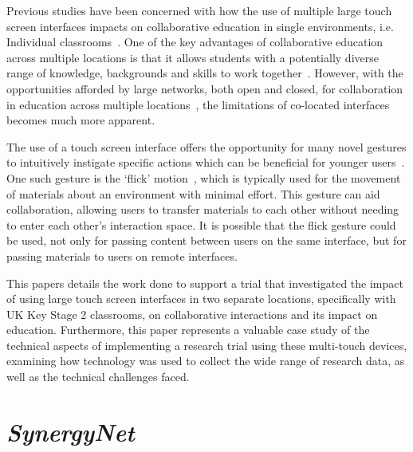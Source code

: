 \documentclass[a4paper,11pt]{article}
\begin{document}
Previous studies have been concerned with how the use of multiple large touch screen interfaces impacts on collaborative education in single environments, i.e. Individual classrooms~\cite{mohammed:2012,kreitmayer:2013,mercier:2015}.
One of the key advantages of collaborative education across multiple locations is that it allows students with a potentially diverse range of knowledge, backgrounds and skills to work together~\cite{kizilcec:2013}.
However, with the opportunities afforded by large networks, both open and closed, for collaboration in education across multiple locations~\cite{daradoumis:2000,mcconnell:2012}, the limitations of co-located interfaces becomes much more apparent.

The use of a touch screen interface offers the opportunity for many novel gestures to intuitively instigate specific actions which can be beneficial for younger users~\cite{kim:2007,wu:2003,rick:2009}.
One such gesture is the `flick' motion~\cite{reetz-et-al:2006}, which is typically used for the movement of materials about an environment with minimal effort.
This gesture can aid collaboration, allowing users to transfer materials to each other without needing to enter each other's interaction space.
 It is possible that the flick gesture could be used, not only for passing content between users on the same interface, but for passing materials to users on remote interfaces.

This papers details the work done to support a trial that investigated the impact of using large touch screen interfaces in two separate locations, specifically with UK Key Stage 2 classrooms, on collaborative interactions and its impact on education. 
Furthermore, this paper represents a valuable case study of the technical aspects of implementing a research trial using these multi-touch devices, examining how technology was used to collect the wide range of research data, as well as the technical challenges faced.


\section{{\emph{SynergyNet}}}
\end{document}
